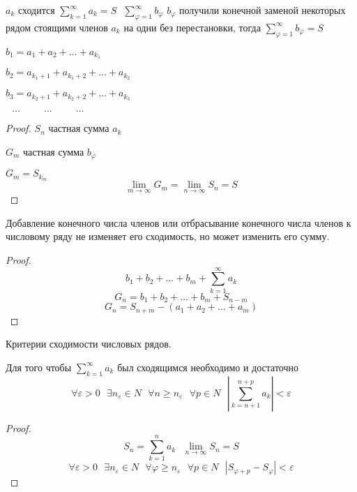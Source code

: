 \begin{theorem}
  $a_k$ сходится
  $
  \sum_{k=1}^{\infty} a_k = S ~~~ \sum_{\varphi = 1}^{\infty} b_{\varphi}
  $
  $b_{\varphi}$ получили конечной заменой некоторых рядом стоящими членов $a_k$
  на одни без перестановки, тогда
  $
  \sum_{\varphi = 1}^{\infty} b_{\varphi} = S
  $

  $
  b_1 = a_1 + a_2 + \ldots + a_{k_1}
  $

  $
  b_2 = a_{k_1+1} + a_{k_1+2} + \ldots + a_{k_2}
  $

  $
  b_3 = a_{k_2+1} + a_{k_2+2} + \ldots + a_{k_3}
  $

  $~~~ \ldots ~~~~~~~~~~~ \ldots ~~~~~~~~~~~ \ldots$
\end{theorem}

\begin{proof}
  $S_n$ частная сумма $a_k$

  $G_m$ частная сумма $b_{\varphi}$

  $G_m = S_{k_m}$
  $$
  \lim_{m \to \infty} G_m = \lim_{n \to \infty} S_n = S
  $$
\end{proof}

\begin{theorem}
  Добавление конечного числа членов или отбрасывание конечного числа членов к
числовому ряду не изменяет его сходимость, но может изменить его сумму.
\end{theorem}

\begin{proof}
  $$
  b_1 + b_2 + \ldots + b_m + \sum_{k=1}^{\infty} a_k
  $$
  $$
  G_n = b_1 + b_2 + \ldots + b_m + S_{n-m}
  $$
  $$
  G_n = S_{n+m} - (a_1 + a_2 + \ldots + a_m)
  $$
\end{proof}

\begin{title}[\Large]
  Критерии сходимости числовых рядов.
\end{title}

\begin{block}
  Для того чтобы $\sum_{k=1}^{\infty} a_k$ был сходящимся необходимо и
  достаточно
  $$
  \forall \varepsilon > 0 ~~~
  \exists n_{\varepsilon} \in N ~~~
  \forall n \ge n_{\varepsilon} ~~~
  \forall p \in N ~~~
  \left| \sum_{k=n+1}^{n+p} a_k \right| < \varepsilon
  $$
\end{block}

\begin{proof}
  $$
  S_n = \sum_{k=1}^n a_k ~~~ \lim_{n \to \infty} S_n = S
  $$
  $$
  \forall \varepsilon > 0 ~~~
  \exists n_{\varepsilon} \in N ~~~
  \forall \varphi \ge n_{\varepsilon} ~~~
  \forall p \in N ~~~
  \left| S_{\varphi + p} - S_{\varphi} \right| < \varepsilon
  $$
\end{proof}

